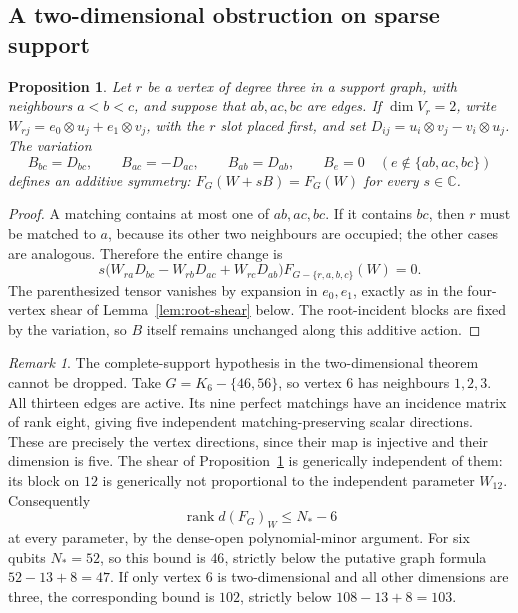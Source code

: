 \documentclass[11pt]{article}
\newtheorem{proposition}[theorem]{Proposition}
\theoremstyle{remark}\newtheorem{remark}[theorem]{Remark}
\DeclareMathOperator{\rank}{rank}
\newcommand{\C}{\mathbb C}
\begin{document}
\subsection{A two-dimensional obstruction on sparse support}
\begin{proposition}\label{prop:degree-three-shear}
Let $r$ be a vertex of degree three in a support graph, with neighbours
$a<b<c$, and suppose that $ab,ac,bc$ are edges. If $\dim V_r=2$, write
$W_{rj}=e_0\otimes u_j+e_1\otimes v_j$, with the $r$ slot placed first,
and set $D_{ij}=u_i\otimes v_j-v_i\otimes u_j$. The variation
\[
 B_{bc}=D_{bc},\qquad B_{ac}=-D_{ac},\qquad B_{ab}=D_{ab},
 \qquad B_e=0\quad(e\notin\{ab,ac,bc\})
\]
defines an additive symmetry: $F_G(W+sB)=F_G(W)$ for every $s\in\C$.
\end{proposition}
\begin{proof}
A matching contains at most one of $ab,ac,bc$. If it contains $bc$,
then $r$ must be matched to $a$, because its other two neighbours are
occupied; the other cases are analogous. Therefore the entire change is
\[
 s\bigl(W_{ra}D_{bc}-W_{rb}D_{ac}+W_{rc}D_{ab}\bigr)
 F_{G-\{r,a,b,c\}}(W)=0.
\]
The parenthesized tensor vanishes by expansion in $e_0,e_1$, exactly as
in the four-vertex shear of Lemma~\ref{lem:root-shear} below. The
root-incident blocks are fixed by the
variation, so $B$ itself remains unchanged along this additive action.
\end{proof}

\begin{remark}\label{ex:sparse-qubit-failure}
The complete-support hypothesis in the two-dimensional theorem cannot
be dropped. Take $G=K_6-\{46,56\}$, so vertex $6$ has neighbours
$1,2,3$. All thirteen edges are active. Its nine perfect matchings
have an incidence matrix of rank eight, giving five independent
matching-preserving scalar directions. These are precisely the vertex
directions, since their map is injective and their dimension is five.
The shear of Proposition~\ref{prop:degree-three-shear} is generically
independent of them: its block on $12$ is generically not proportional
to the independent parameter $W_{12}$. Consequently
\[
 \rank d(F_G)_W\leq N_*-6
\]
at every parameter, by the dense-open polynomial-minor argument.
For six qubits $N_*=52$, so this bound is $46$, strictly below the
putative graph formula $52-13+8=47$. If only vertex $6$ is
two-dimensional and all other dimensions are three, the corresponding
bound is $102$, strictly below $108-13+8=103$.
\end{remark}
\end{document}
